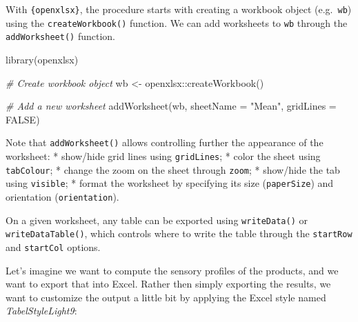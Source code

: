\documentclass[
]{book}
\newenvironment{Shaded}{\begin{snugshade}}{\end{snugshade}}
\newcommand{\AttributeTok}[1]{\textcolor[rgb]{0.77,0.63,0.00}{#1}}
\newcommand{\CommentTok}[1]{\textcolor[rgb]{0.56,0.35,0.01}{\textit{#1}}}
\newcommand{\ConstantTok}[1]{\textcolor[rgb]{0.00,0.00,0.00}{#1}}
\newcommand{\FunctionTok}[1]{\textcolor[rgb]{0.00,0.00,0.00}{#1}}
\newcommand{\NormalTok}[1]{#1}
\newcommand{\OtherTok}[1]{\textcolor[rgb]{0.56,0.35,0.01}{#1}}
\newcommand{\SpecialCharTok}[1]{\textcolor[rgb]{0.00,0.00,0.00}{#1}}
\newcommand{\StringTok}[1]{\textcolor[rgb]{0.31,0.60,0.02}{#1}}
\begin{document}
With \texttt{\{openxlsx\}}, the procedure starts with creating a workbook object (e.g.~\texttt{wb}) using the \texttt{createWorkbook()} function. We can add worksheets to \texttt{wb} through the \texttt{addWorksheet()} function.

\begin{Shaded}
\begin{Highlighting}[]
\FunctionTok{library}\NormalTok{(openxlsx)}

\CommentTok{\# Create workbook object}
\NormalTok{wb }\OtherTok{\textless{}{-}}\NormalTok{ openxlsx}\SpecialCharTok{::}\FunctionTok{createWorkbook}\NormalTok{()}

\CommentTok{\# Add a new worksheet}
\FunctionTok{addWorksheet}\NormalTok{(wb, }\AttributeTok{sheetName =} \StringTok{"Mean"}\NormalTok{, }\AttributeTok{gridLines =} \ConstantTok{FALSE}\NormalTok{)}
\end{Highlighting}
\end{Shaded}

Note that \texttt{addWorksheet()} allows controlling further the appearance of the worksheet:
* show/hide grid lines using \texttt{gridLines};
* color the sheet using \texttt{tabColour};
* change the zoom on the sheet through \texttt{zoom};
* show/hide the tab using \texttt{visible};
* format the worksheet by specifying its size (\texttt{paperSize}) and orientation (\texttt{orientation}).

On a given worksheet, any table can be exported using \texttt{writeData()} or \texttt{writeDataTable()}, which controls where to write the table through the \texttt{startRow} and \texttt{startCol} options.

Let's imagine we want to compute the sensory profiles of the products, and we want to export that into Excel. Rather then simply exporting the results, we want to customize the output a little bit by applying the Excel style named \emph{TabelStyleLight9}:
\end{document}
